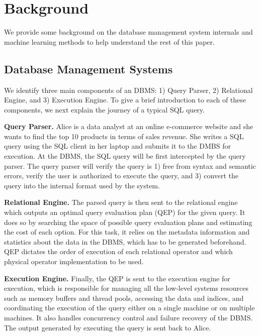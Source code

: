 \section{Background}
We provide some background on the database management system internals and machine learning methods to help understand the rest of this paper.

\subsection{Database Management Systems}
We identify three main components of an DBMS: 1) Query Parser, 2) Relational Engine, and 3) Execution Engine.
To give a brief introduction to each of these components, we next explain the journey of a typical SQL query.

\vspace{2mm}
\noindent \textbf{Query Parser.} Alice is a data analyst at an online e-commerce website and she wants to find the top 10 products in terms of sales revenue.
She writes a SQL query using the SQL client in her laptop and submits it to the DMBS for execution.
At the DBMS, the SQL query will be first intercepted by the query parser.
The query parser will verify the query is 1) free from syntax and semantic errors, verify the user is authorized to execute the query, and 3) convert the query into the internal format used by the system.

\vspace{2mm}
\noindent \textbf{Relational Engine.} The parsed query is then sent to the relational engine which outputs an optimal query evaluation plan (QEP) for the given query.
It does so by searching the space of possible query evaluation plans and estimating the cost of each option.
For this task, it relies on the metadata information and statistics about the data in the DBMS, which has to be generated beforehand.
QEP dictates the order of execution of each relational operator and which physical operator implementation to be used.

\vspace{2mm}
\noindent \textbf{Execution Engine.} Finally, the QEP is sent to the execution engine for execution, which is responsible for managing all the low-level systems resources such as memory buffers and thread pools, accessing the data and indices, and coordinating the execution of the query either on a single machine or on multiple machines.
It also handles concurrency control and failure recovery of the DBMS.
The output generated by executing the query is sent back to Alice.

